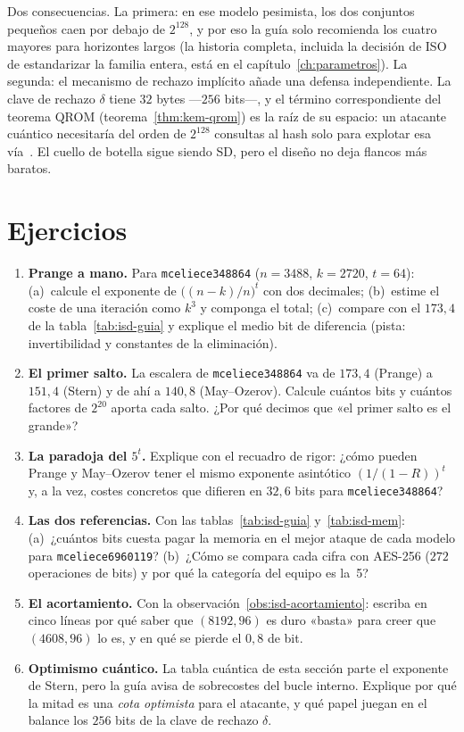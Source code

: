 Dos consecuencias. La primera: en ese modelo pesimista, los dos
conjuntos pequeños caen por debajo de $2^{128}$, y por eso la guía
solo recomienda los cuatro mayores para horizontes largos (la
historia completa, incluida la decisión de ISO de estandarizar la
familia entera, está en el capítulo~\ref{ch:parametros}). La
segunda: el mecanismo de rechazo implícito añade una defensa
independiente. La clave de rechazo $\delta$ tiene $32$ bytes ---$256$
bits---, y el término correspondiente del teorema QROM
(teorema~\ref{thm:kem-qrom}) es la raíz de su espacio: un atacante
cuántico necesitaría del orden de $2^{128}$ consultas al hash solo
para explotar esa vía~\cite{cmsecurity}. El cuello de botella sigue
siendo SD, pero el diseño no deja flancos más baratos.

\section{Ejercicios}

\begin{enumerate}[leftmargin=1.6em,itemsep=4pt]
  \item \textbf{Prange a mano.} Para \texttt{mceliece348864}
        ($n=3488$, $k=2720$, $t=64$): (a)~calcule el exponente de
        $\bigl((n-k)/n\bigr)^{t}$ con dos decimales; (b)~estime el
        coste de una iteración como $k^{3}$ y componga el total;
        (c)~compare con el $173{,}4$ de la tabla~\ref{tab:isd-guia}
        y explique el medio bit de diferencia (pista: invertibilidad
        y constantes de la eliminación).
  \item \textbf{El primer salto.} La escalera de
        \texttt{mceliece348864} va de $173{,}4$ (Prange) a $151{,}4$
        (Stern) y de ahí a $140{,}8$ (May--Ozerov). Calcule cuántos
        bits y cuántos factores de $2^{20}$ aporta cada salto.
        ¿Por qué decimos que «el primer salto es el grande»?
  \item \textbf{La paradoja del $5^{t}$.} Explique con el recuadro
        de rigor: ¿cómo pueden Prange y May--Ozerov tener el mismo
        exponente asintótico $(1/(1-R))^{t}$ y, a la vez, costes
        concretos que difieren en $32{,}6$ bits para
        \texttt{mceliece348864}?
  \item \textbf{Las dos referencias.} Con las
        tablas~\ref{tab:isd-guia} y~\ref{tab:isd-mem}: (a)~¿cuántos
        bits cuesta pagar la memoria en el mejor ataque de cada
        modelo para \texttt{mceliece6960119}? (b)~¿Cómo se compara
        cada cifra con AES-256 ($272$ operaciones de bits) y por qué
        la categoría del equipo es la~5?
  \item \textbf{El acortamiento.} Con la
        observación~\ref{obs:isd-acortamiento}: escriba en cinco
        líneas por qué saber que $(8192,96)$ es duro «basta» para
        creer que $(4608,96)$ lo es, y en qué se pierde el $0{,}8$
        de bit.
  \item \textbf{Optimismo cuántico.} La tabla cuántica de esta
        sección parte el exponente de Stern, pero la guía avisa de
        sobrecostes del bucle interno. Explique por qué la mitad es
        una \emph{cota optimista} para el atacante, y qué papel
        juegan en el balance los $256$ bits de la clave de rechazo
        $\delta$.
\end{enumerate}
